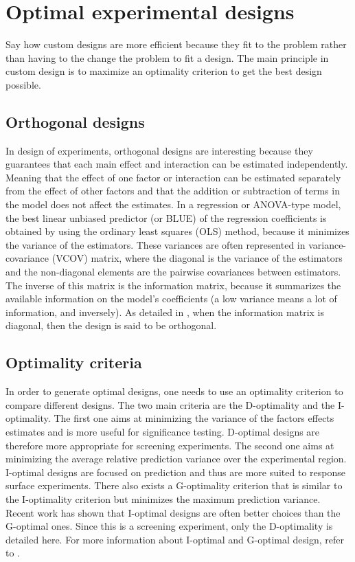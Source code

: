 
\section{Optimal experimental designs}
\begin{formal}
Say how custom designs are more efficient because they fit to the problem rather than having to the change the problem to fit a 
design.
The main principle in custom design is to maximize an optimality criterion to get the best design possible.
\end{formal}

\subsection{Orthogonal designs}
In design of experiments, orthogonal designs are interesting because they guarantees that each main effect and interaction can 
be estimated independently. Meaning that the effect of one factor or interaction can be estimated separately from the effect of 
other factors
and that the addition or subtraction of terms in the model does not affect the estimates.
In a regression or ANOVA-type model, the best linear unbiased predictor (or BLUE) of the regression coefficients is obtained by 
using 
the ordinary least squares (OLS) method, because it minimizes the variance of the estimators. 
These variances are often represented in variance-covariance (VCOV) matrix, 
where the diagonal is the variance of the estimators and the non-diagonal elements are the pairwise covariances between 
estimators. 
The inverse of this matrix is the information matrix, 
because it summarizes the available information  on the model's coefficients (a low variance means a lot of information, and 
inversely).
As detailed in \textcite{goos_optimal_2011}, when the information matrix is diagonal, then the design is said to be orthogonal.

\subsection{Optimality criteria}
In order to generate optimal designs, one needs to use an optimality criterion to compare different designs. 
The two main criteria are the D-optimality and the I-optimality. 
The first one aims at minimizing the variance of the factors effects estimates and is more useful for significance testing. 
D-optimal designs are therefore more appropriate for screening experiments. 
The second one aims at minimizing the average relative prediction variance over the experimental region. 
I-optimal designs are focused on prediction and thus are more suited to response surface experiments.
There also exists a G-optimality criterion that is similar to the I-optimality criterion but minimizes the maximum prediction 
variance. 
Recent work \parencite{rodriguez_generating_2010} has shown that I-optimal designs are often better choices than the G-optimal 
ones. 
Since this is a screening experiment, only the D-optimality is detailed here. 
For more information about I-optimal and G-optimal design, refer to \textcite{goos_optimal_2011,atkinson2014optimal}.

